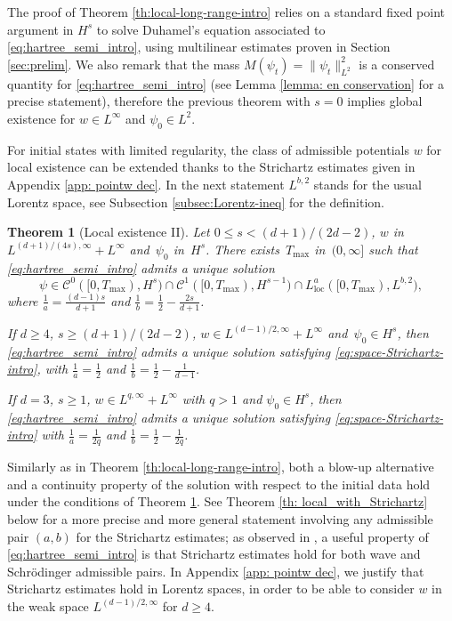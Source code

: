 \documentclass[12pt]{article}
\theoremstyle{plain}
\newtheorem{theo}{Theorem}[section]
\begin{document}
The proof of Theorem \ref{th:local-long-range-intro} relies on a standard fixed point argument in $H^s$ to solve Duhamel's equation associated to \eqref{eq:hartree_semi_intro}, using multilinear estimates proven in Section \ref{sec:prelim}.
We also remark that the mass $M(\psi_t)=\|\psi_t\|_{L^2}^2$ is a conserved quantity for  \eqref{eq:hartree_semi_intro} (see Lemma \ref{lemma: en conservation} for a precise statement), therefore the previous theorem with $s=0$ implies global existence for $w\in L^\infty$ and $\psi_0\in L^2$. 

For initial states with limited regularity, the class of admissible potentials $w$ for local existence can be extended    thanks to the Strichartz  estimates given in Appendix \ref{app: pointw dec}. In the next statement $L^{b,2}$ stands for the usual Lorentz space, see Subsection \ref{subsec:Lorentz-ineq} for the definition.

	\begin{theo}[Local existence II]\label{th: local_with_Strichartz-intro}
	    Let $0\le s<(d+1)/(2d-2)$,  $w$ in $L^{(d+1)/(4s),\infty}+L^\infty$ and~$\psi_{0}$ in~$H^{s}$. There exists~$T_{\max}$ in~$(0,\infty]$ such that \eqref{eq:hartree_semi_intro} admits a unique solution 
\begin{equation}\label{eq:space-Strichartz-intro}
\psi\in\mathcal{C}^{0}([0,T_{\max}),H^{s})\cap \mathcal{C}^{1}([0,T_{\max}),H^{s-1})\cap L^a_{\mathrm{loc}}([0,T_{\max}),L^{b,2}),
\end{equation}
where $\frac1a=\frac{(d-1)s}{d+1}$ and $\frac1b=\frac12-\frac{2s}{d+1}$.

If $d\ge4$, $s\ge (d+1)/(2d-2)$, $w\in  L^{(d-1)/2,\infty}+L^\infty$ and~$\psi_{0}\in H^{s}$, then \eqref{eq:hartree_semi_intro} admits a unique solution satisfying \eqref{eq:space-Strichartz-intro}, with $\frac1a=\frac12$ and $\frac1b=\frac12-\frac1{d-1}$.

If $d=3$, $s\ge1$, $w\in L^{q,\infty}+L^\infty$ with $q>1$ and $\psi_0\in H^s$, then \eqref{eq:hartree_semi_intro} admits a unique solution satisfying \eqref{eq:space-Strichartz-intro} with $\frac1a=\frac1{2q}$ and $\frac1b=\frac12-\frac1{2q}$.
	\end{theo}
Similarly as in Theorem \ref{th:local-long-range-intro}, both a blow-up alternative and a continuity property of the solution with respect to the initial data hold under the conditions of Theorem \ref{th: local_with_Strichartz-intro}. See Theorem \ref{th: local_with_Strichartz} below for a more precise and more general statement involving any admissible pair $(a,b)$ for the Strichartz estimates; as observed in \cite{GinibreVelo_Timedecay}, a useful property of \eqref{eq:hartree_semi_intro} is that Strichartz estimates hold for both wave and Schrödinger admissible pairs. In Appendix \ref{app: pointw dec}, we justify that Strichartz estimates hold in Lorentz spaces, in order to be able to consider $w$ in the weak space $L^{(d-1)/2,\infty}$ for $d\ge4$.
\end{document}
